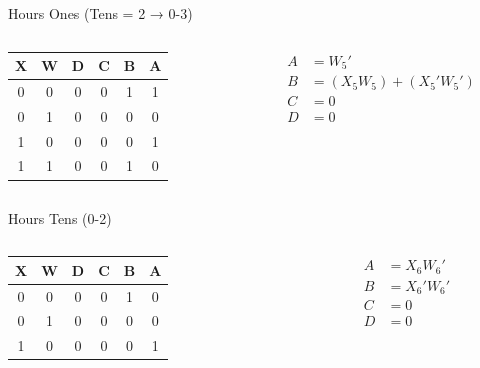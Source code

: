 \documentclass{beamer}
\begin{document}
\begin{frame}{Hours Ones (Tens = 2 → 0-3)}
\begin{columns}
\begin{column}{0.5\textwidth}
\centering
\begin{tabular}{|c|c||c|c|c|c|}
\hline
X & W & D & C & B & A\\
\hline
0&0&0&0&1&1\\
0&1&0&0&0&0\\
1&0&0&0&0&1\\
1&1&0&0&1&0\\
\hline
\end{tabular}
\end{column}
\begin{column}{0.5\textwidth}
\begin{align*}
A &= W_5'\\
B &= (X_5 W_5) + (X_5' W_5')\\
C &= 0\\
D &= 0
\end{align*}
\end{column}
\end{columns}
\end{frame}

\begin{frame}{Hours Tens (0-2)}
\begin{columns}
\begin{column}{0.5\textwidth}
\centering
\begin{tabular}{|c|c||c|c|c|c|}
\hline
X & W & D & C & B & A\\
\hline
0&0&0&0&1&0\\
0&1&0&0&0&0\\
1&0&0&0&0&1\\
\hline
\end{tabular}
\end{column}
\begin{column}{0.5\textwidth}
\begin{align*}
A &= X_6 W_6'\\
B &= X_6' W_6'\\
C &= 0\\
D &= 0
\end{align*}
\end{column}
\end{columns}
\end{frame}
\end{document}
